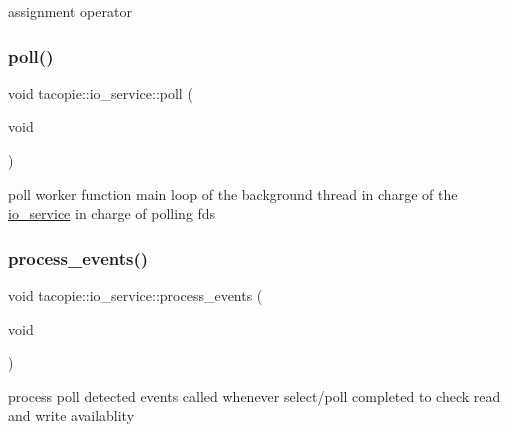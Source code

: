 assignment operator 

\mbox{\label{classtacopie_1_1io__service_a03813e0e91d70d367f9fb0ff0d86d3dd}} 
\subsubsection{\texorpdfstring{poll()}{poll()}}
{\footnotesize\ttfamily void tacopie\+::io\+\_\+service\+::poll (\begin{DoxyParamCaption}\item[{void}]{ }\end{DoxyParamCaption})\hspace{0.3cm}{\ttfamily [private]}}

poll worker function main loop of the background thread in charge of the \hyperlink{classtacopie_1_1io__service}{io\+\_\+service} in charge of polling fds \mbox{\label{classtacopie_1_1io__service_a90a2ab7b6bbaf10bbc0607ce371cc806}} 
\subsubsection{\texorpdfstring{process\+\_\+events()}{process\_events()}}
{\footnotesize\ttfamily void tacopie\+::io\+\_\+service\+::process\+\_\+events (\begin{DoxyParamCaption}\item[{void}]{ }\end{DoxyParamCaption})\hspace{0.3cm}{\ttfamily [private]}}

process poll detected events called whenever select/poll completed to check read and write availablity \mbox{\label{classtacopie_1_1io__service_a65c3ef9fa1473708b81b05029f6861f9}} 
